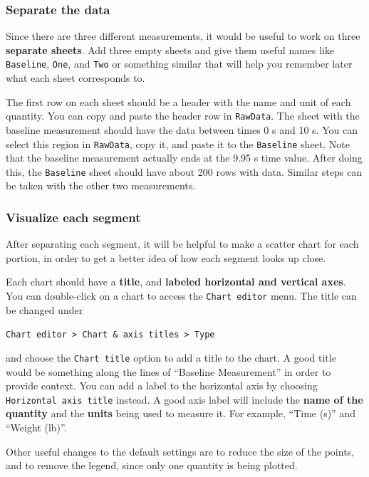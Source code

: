 \subsubsection{Separate the data}
Since there are three different measurements, it would be useful to work on three \textbf{separate sheets}. Add three empty sheets and give them useful names like \texttt{Baseline}, \texttt{One}, and \texttt{Two} or something similar that will help you remember later what each sheet corresponds to.

The first row on each sheet should be a header with the name and unit of each quantity. You can copy and paste the header row in \texttt{RawData}. The sheet with the baseline measurement should have the data between times 0 s and 10 s. You can select this region in \texttt{RawData}, copy it, and paste it to the \texttt{Baseline} sheet. Note that the baseline measurement actually ends at the 9.95 s time value. After doing this, the \texttt{Baseline} sheet should have about 200 rows with data. Similar steps can be taken with the other two measurements.
\subsubsection{Visualize each segment}
After separating each segment, it will be helpful to make a scatter chart for each portion, in order to get a better idea of how each segment looks up close.

Each chart should have a \textbf{title}, and \textbf{labeled horizontal and vertical axes}. You can double-click on a chart to access the \texttt{Chart editor} menu. The title can be changed under
\begin{center}
    \texttt{Chart editor > Chart \& axis titles > Type}
\end{center}
and choose the \texttt{Chart title} option to add a title to the chart. A good title would be something along the lines of ``Baseline Measurement'' in order to provide context. You can add a label to the horizontal axis by choosing \texttt{Horizontal axis title} instead. A good axis label will include the \textbf{name of the quantity} and the \textbf{units} being used to measure it. For example, ``Time (s)'' and ``Weight (lb)''.

Other useful changes to the default settings are to reduce the size of the points, and to remove the legend, since only one quantity is being plotted.

